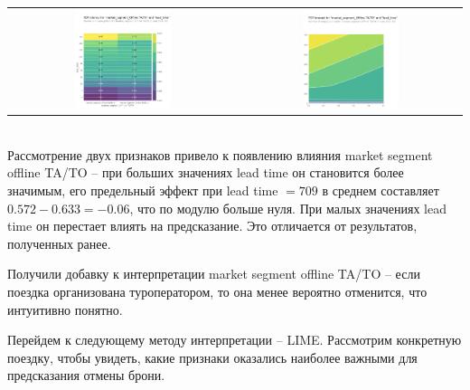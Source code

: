 \begin{tabular}{c|c}
	\arrayrulecolor[rgb]{0.8,0.85,1}
	\includegraphics*[width = 0.44\textwidth]{pics/mypdp9.png} & \includegraphics*[width = 0.45\textwidth]{pics/mypdp10.png}\\
\end{tabular}\\[2mm]

Рассмотрение двух признаков привело к появлению влияния market segment offline TA/TO -- при больших значениях lead time он становится более значимым, его предельный эффект при lead time $=709$ в среднем составляет $0.572-0.633=-0.06$, что по модулю больше нуля. При малых значениях lead time он перестает влиять на предсказание. Это отличается от результатов, полученных ранее.

Получили добавку к интерпретации market segment offline TA/TO -- если поездка организована туроператором, то она менее вероятно отменится, что интуитивно понятно.

Перейдем к следующему методу интерпретации -- LIME. Рассмотрим конкретную поездку, чтобы увидеть, какие признаки оказались наиболее важными для предсказания отмены брони.
